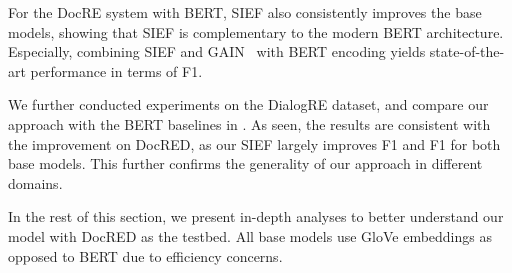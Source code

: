 \documentclass[11pt]{article}
\begin{document}
For the DocRE system with BERT, SIEF also consistently improves the base models, showing that SIEF is complementary to the modern BERT architecture. Especially, combining SIEF and GAIN~\cite{zeng-etal-2020-double} with BERT encoding yields state-of-the-art performance in terms of F1.

We further conducted experiments on the DialogRE dataset, and compare our approach with the BERT baselines in . As seen, the results are consistent with the improvement on DocRED, as our SIEF largely improves F1 and F1 for both base models. This further confirms the generality of our approach in different domains.

In the rest of this section, we present in-depth analyses to better understand our model with DocRED as the testbed. All base models use GloVe embeddings as opposed to BERT due to efficiency concerns.
\end{document}
